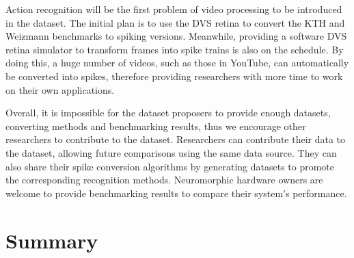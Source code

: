 Action recognition will be the first problem of video processing to be introduced in the dataset.
The initial plan is to use the DVS retina to convert the KTH and Weizmann benchmarks to spiking versions.
Meanwhile, providing a software DVS retina simulator to transform frames into spike trains is also on the schedule.
By doing this, a huge number of videos, such as those in YouTube, can automatically be converted into spikes, therefore providing researchers with more time to work on their own applications.

Overall, it is impossible for the dataset proposers to provide enough datasets, converting methods and benchmarking results, thus we encourage other researchers to contribute to the dataset.
Researchers can contribute their data to the dataset, allowing future comparisons using the same data source.
They can also share their spike conversion algorithms by generating datasets to promote the corresponding recognition methods.
Neuromorphic hardware owners are welcome to provide benchmarking results to compare their system's performance.
\section{Summary}

